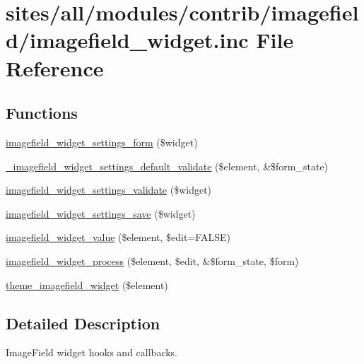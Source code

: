 \hypertarget{imagefield__widget_8inc}{
\section{sites/all/modules/contrib/imagefield/imagefield\_\-widget.inc File Reference}
\label{imagefield__widget_8inc}
}
\subsection*{Functions}
\begin{CompactItemize}
\item 
\hyperlink{imagefield__widget_8inc_8d7bbdfe64674cd66f47fbbe40c61bd1}{imagefield\_\-widget\_\-settings\_\-form} (\$widget)
\item 
\hyperlink{imagefield__widget_8inc_c902595bd50fc51acc2abb4265472334}{\_\-imagefield\_\-widget\_\-settings\_\-default\_\-validate} (\$element, \&\$form\_\-state)
\item 
\hyperlink{imagefield__widget_8inc_ccae8d405d05c22db3fdbe3cdd8cd0de}{imagefield\_\-widget\_\-settings\_\-validate} (\$widget)
\item 
\hyperlink{imagefield__widget_8inc_6c7971999c540262989875a5dc50ec2c}{imagefield\_\-widget\_\-settings\_\-save} (\$widget)
\item 
\hyperlink{imagefield__widget_8inc_28634da6db6808b6b566de5e871bdd72}{imagefield\_\-widget\_\-value} (\$element, \$edit=FALSE)
\item 
\hyperlink{imagefield__widget_8inc_9bf0d34e0cb382ec9814b37edfcce5d7}{imagefield\_\-widget\_\-process} (\$element, \$edit, \&\$form\_\-state, \$form)
\item 
\hyperlink{imagefield__widget_8inc_cc1ccabf552d770aa55ce34aab46b1aa}{theme\_\-imagefield\_\-widget} (\$element)
\end{CompactItemize}


\subsection{Detailed Description}
ImageField widget hooks and callbacks. 


